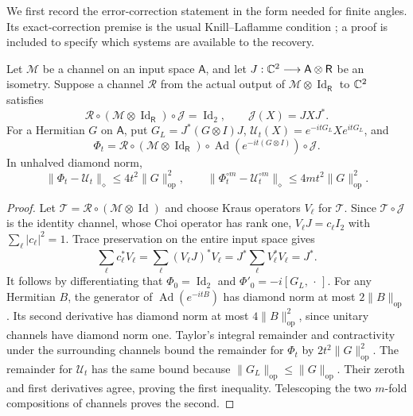 We first record the error-correction statement in the form needed for
finite angles.  Its exact-correction premise is the usual
Knill--Laflamme condition \cite{KL84}; a proof is included to specify
which systems are available to the recovery.

\begin{lemma}\label{lem:correctedchannel84}
Let $\mathcal M$ be a channel on an input space $\mathsf A$, and
let $J:\mathbb C^2\longrightarrow\mathsf A\otimes\mathsf R$ be an isometry.
Suppose a channel $\mathcal R$ from the actual output of
$\mathcal M\otimes\operatorname{Id}_{\mathsf R}$ to $\mathbb C^2$ satisfies
\[
 \mathcal R\circ(\mathcal M\otimes\operatorname{Id}_{\mathsf R})
          \circ\mathcal J=\operatorname{Id}_2,
 \qquad \mathcal J(X)=JXJ^*.
\]
For a Hermitian $G$ on $\mathsf A$, put
$G_L=J^*(G\otimes I)J$, $\mathcal U_t(X)=e^{-itG_L}Xe^{itG_L}$,
and
\[
 \Phi_t=\mathcal R\circ(\mathcal M\otimes\operatorname{Id}_{\mathsf R})
       \circ\operatorname{Ad}(e^{-it(G\otimes I)})\circ\mathcal J.
\]
In unhalved diamond norm,
\begin{equation}\label{eq:logicalerror84}
 \|\Phi_t-\mathcal U_t\|_\diamond
 \le4t^2\|G\|_{\mathrm{op}}^2,
 \qquad
 \|\Phi_t^{\circ m}-\mathcal U_t^{\circ m}\|_\diamond
 \le4mt^2\|G\|_{\mathrm{op}}^2.
\end{equation}
\end{lemma}
\begin{proof}
Let $\mathcal T=\mathcal R\circ(\mathcal M\otimes\operatorname{Id})$
and choose Kraus operators $V_\ell$ for $\mathcal T$.  Since
$\mathcal T\circ\mathcal J$ is the identity channel, whose Choi
operator has rank one, $V_\ell J=c_\ell I_2$ with
$\sum_\ell|c_\ell|^2=1$.  Trace preservation on the entire input
space gives
\[
 \sum_\ell c_\ell^*V_\ell
 =\sum_\ell(V_\ell J)^*V_\ell
 =J^*\sum_\ell V_\ell^*V_\ell=J^*.
\]
It follows by differentiating that $\Phi_0=\operatorname{Id}_2$
and $\Phi'_0=-i[G_L,\,\cdot\,]$.
For any Hermitian $B$, the generator of $\operatorname{Ad}(e^{-itB})$
has diamond norm at most $2\|B\|_{\mathrm{op}}$.  Its second
 derivative has diamond norm at most $4\|B\|_{\mathrm{op}}^2$,
since unitary channels have diamond norm one.  Taylor's integral
remainder and contractivity under the surrounding channels bound
the remainder for $\Phi_t$ by $2t^2\|G\|_{\mathrm{op}}^2$.
The remainder for $\mathcal U_t$ has the same bound because
$\|G_L\|_{\mathrm{op}}\le\|G\|_{\mathrm{op}}$.  Their zeroth
and first derivatives agree, proving the first inequality.
Telescoping the two $m$-fold compositions of channels proves the second.
\end{proof}

